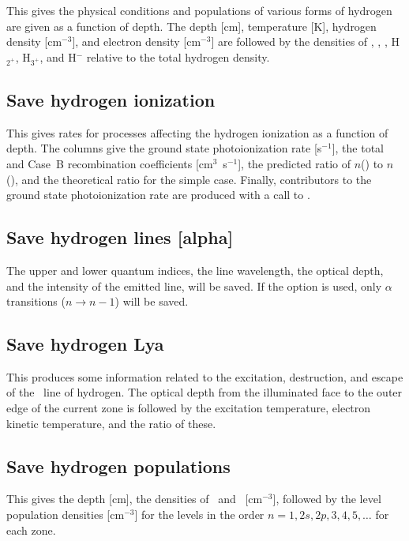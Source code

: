 This gives the physical conditions and populations of various forms of
hydrogen are given as a function of depth.  The depth [cm], temperature
[K], hydrogen density [cm$^{-3}$], and electron density [cm$^{-3}$] are followed by
the densities of \hO, \hplus, \htwo, H$_{2^{+}}$, H$_{3^{+}}$, and H$^-$ relative to the total hydrogen
density.

\subsection{Save hydrogen ionization}

This gives rates for processes affecting the hydrogen ionization as a
function of depth.  The columns give the ground state photoionization rate
[s$^{-1}$], the total and Case~B recombination coefficients [cm$^3$~s$^{-1}$], the
predicted ratio of $n$(\hplus) to $n$(\hO), and the theoretical ratio for the simple
case.  Finally, contributors to the ground state photoionization rate are
produced with a call to .

\subsection{Save hydrogen lines [alpha]}

The upper and lower quantum indices, the line wavelength, the optical
depth, and the intensity of the emitted line, will be saved. If the 
option is used, only $\alpha$ transitions ($n\to n-1$) will be saved.

\subsection{Save hydrogen Lya}

This produces some information related to the excitation, destruction,
and escape of the \la\ line of hydrogen.  The optical depth from the
illuminated face to the outer edge of the current zone is followed by the
excitation temperature, electron kinetic temperature, and the ratio of these.

\subsection{Save hydrogen populations}

This gives the depth [cm], the densities of \hO\ and \hplus\ [cm$^{-3}$],
followed by the level population densities [cm$^{-3}$]
for the levels in the order $n = 1, 2s, 2p, 3, 4, 5,\dots$ for each zone.

